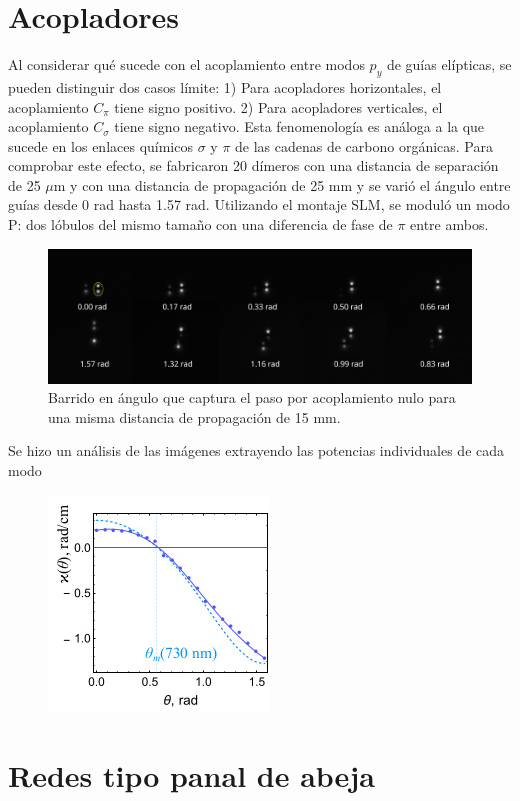 \section{Acopladores}
Al considerar qué sucede con el acoplamiento entre modos $p_y$ de guías elípticas, se pueden distinguir dos casos límite: 1) Para acopladores horizontales, el acoplamiento $C_\pi$ tiene signo positivo. 2) Para acopladores verticales, el acoplamiento $C_\sigma$ tiene signo negativo. Esta fenomenología es análoga a la que sucede en los enlaces químicos $\sigma$ y $\pi$ de las cadenas de carbono orgánicas. Para comprobar este efecto, se fabricaron 20 dímeros con una distancia de separación de 25 $\mu$m y con una distancia de propagación de 25 mm y se varió el ángulo entre guías desde 0 rad hasta 1.57 rad. Utilizando el montaje SLM, se moduló un modo P: dos lóbulos del mismo tamaño con una diferencia de fase de $\pi$ entre ambos. 
\begin{figure}[H]
	\centering
	\includegraphics[trim={0 2cm 0 4cm},clip, width=\linewidth]{media/26um_15mm_angles.png}
	\caption{Barrido en ángulo que captura el paso por acoplamiento nulo para una misma distancia de propagación de 15 mm. \label{fig:angulobarrido}}
\end{figure}
Se hizo un análisis de las imágenes extrayendo las potencias individuales de cada modo
\begin{figure}[H]
\centering
	\includegraphics[width=0.5\linewidth]{media/couplingvsangle.jpg}
\end{figure}
\section{Redes tipo panal de abeja}

